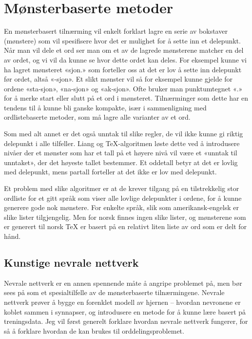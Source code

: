 \section{Mønsterbaserte metoder}

En mønsterbasert tilnærming vil enkelt forklart lagre en serie av bokstaver (mønstere) som vil spesifisere hvor det er mulighet for å sette inn et delepunkt. Når man vil dele et ord ser man om et av de lagrede mønsterene matcher en del av ordet, og vi vil da kunne se hvor dette ordet kan deles. For eksempel kunne vi ha lagret mønsteret «sjon.» som forteller oss at det er lov å sette inn delepunkt før ordet, altså «-sjon». Et slikt mønster vil så for eksempel kunne gjelde for ordene «sta-sjon», «na-sjon» og «ak-sjon». Ofte bruker man punktumtegnet «.» for å merke start eller slutt på et ord i mønsteret. Tilnærminger som dette har en tendens til å kunne bli ganske kompakte, især i sammenligning med ordlistebaserte metoder, som må lagre alle varianter av et ord. 

Som med alt annet er det også unntak til slike regler, de vil ikke kunne gi riktig delepunkt i alle tilfeller. Liang og \TeX{}-algoritmen løste dette ved å introdusere nivåer der et mønster som har et tall på et høyere nivå vil være et «unntak til unntaket», der det høyeste tallet bestemmer. Et oddetall betyr at det er lovlig med delepunkt, mens partall forteller at det ikke er lov med delepunkt. \cite{liang1983word}

Et problem med slike algoritmer er at de krever tilgang på en tilstrekkelig stor ordliste for et gitt språk som viser alle lovlige delepunkter i ordene, for å kunne generere gode nok mønstere. For enkelte språk, slik som amerikansk-engelsk er slike lister tilgjengelig. Men for norsk finnes ingen slike lister, og mønsterene som er generert til norsk \TeX{} er basert på en relativt liten liste av ord som er delt for hånd. \cite{thoresen1993virtuelle}

\subsection{Kunstige nevrale nettverk}

Nevrale nettverk er en annen spennende måte å angripe problemet på, men bør sees på som et spesialtilfelle av de mønsterbaserte tilnærmingene. Nevrale nettverk prøver å bygge en forenklet modell av hjernen -- hvordan nevronene er koblet sammen i synnapser, og introdusere en metode for å kunne lære basert på treningsdata. Jeg vil først generelt forklare hvordan nevrale nettverk fungerer, for så å forklare hvordan de kan brukes til orddelingsproblemet.

